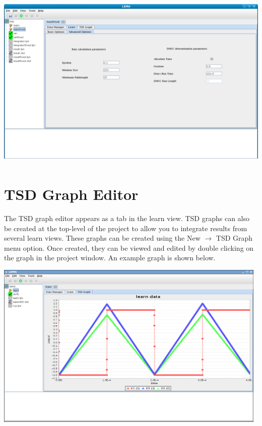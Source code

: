 \documentclass[titlepage,11pt]{article}
\begin{document}
\begin{center}
\includegraphics[height=85mm]{screenshots/learnAdvLema}
\end{center}

\section{\label{TSDEdit}TSD Graph Editor}

\noindent
The TSD graph editor appears as a tab in the learn
view.  TSD graphs can also be created at the top-level of the project
to allow you to integrate results from several learn
views. These graphs can be created using the New $\rightarrow$ TSD Graph
menu option. Once created, they can be viewed and edited by double
clicking on the graph in the project window.  An example graph is
shown below.
\begin{center}
\includegraphics[height=80mm]{screenshots/TSDgraphLema}
\end{center}
\end{document}
